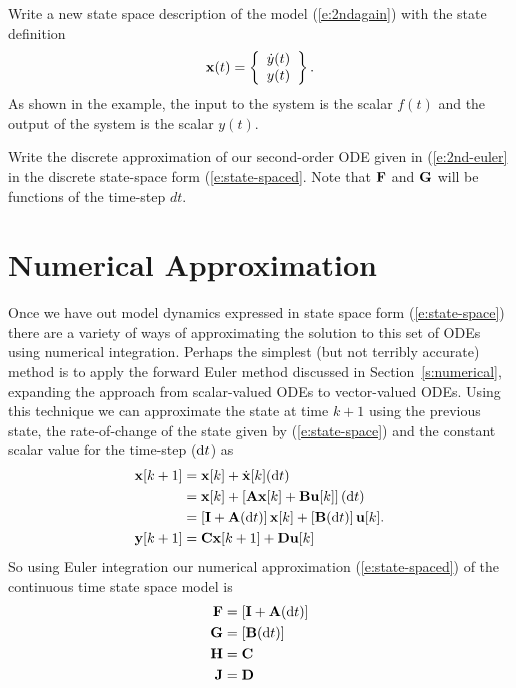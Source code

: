 \begin{ex}
Write a new state space description of the model (\ref{e:2ndagain}) with the state definition
\[
\mbox{${\bf x}$}(t)  =  \left\{ \begin{array}{c}
\dot{y}(t) \\
y(t)
\end{array} \right\}.
\]
As shown in the example, the input to the system is the scalar $f(t)$ and the output of the system is the scalar $y(t)$. 
\end{ex}

\begin{ex}
Write the discrete approximation of our second-order ODE given in (\ref{e:2nd-euler} in the discrete state-space form (\ref{e:state-spaced}.  Note that $\mbox{${\bf F}$}$ and $\mbox{${\bf G}$}$ will be functions of the time-step $dt$.
\end{ex}


\section{Numerical Approximation}
Once we have out model dynamics expressed in state space form (\ref{e:state-space}) there are a variety of ways of approximating the solution to this set of ODEs using numerical integration.  Perhaps the simplest (but not terribly accurate) method is to apply the forward Euler method discussed in Section~\ref{s:numerical}, expanding the approach from scalar-valued ODEs to vector-valued ODEs.  Using this technique we can approximate the state at time $k+1$ using the previous state, the rate-of-change of the state given by (\ref{e:state-space}) and the constant scalar value for the time-step ($\mathrm{d}t$) as
\begin{align}
\label{e:state-space-euler}
\mbox{${\bf x}$}[k+1] & = \mbox{${\bf x}$}[k] + \dot{\mbox{${\bf x}$}}[k](\mathrm{d}t) \nonumber \\
           & = \mbox{${\bf x}$}[k] + \left[\mbox{${\bf A}$}\mbox{${\bf x}$}[k]+\mbox{${\bf B}$}\mbox{${\bf u}$}[k]\right](\mathrm{d}t) \nonumber \\
           & = \left[\mbox{${\bf I}$}+\mbox{${\bf A}$}(\mathrm{d}t)\right]\mbox{${\bf x}$}[k] + \left[\mbox{${\bf B}$}(\mathrm{d}t)\right]\mbox{${\bf u}$}[k]. \nonumber \\
\mbox{${\bf y}$}[k+1] & = \mbox{${\bf C}$}\mbox{${\bf x}$}[k+1] + \mbox{${\bf D}$}\mbox{${\bf u}$}[k]
\end{align}
So using Euler integration our numerical approximation (\ref{e:state-spaced}) of the continuous time state space model is
\begin{align}
\label{e:state-space-euler2}
\mbox{${\bf F}$} & = \left[\mbox{${\bf I}$}+\mbox{${\bf A}$}(\mathrm{d}t)\right] \nonumber \\
\mbox{${\bf G}$} & = \left[\mbox{${\bf B}$}(\mathrm{d}t)\right] \nonumber \\
\mbox{${\bf H}$} & = \mbox{${\bf C}$} \nonumber \\
\mbox{${\bf J}$} & = \mbox{${\bf D}$}
\end{align}

